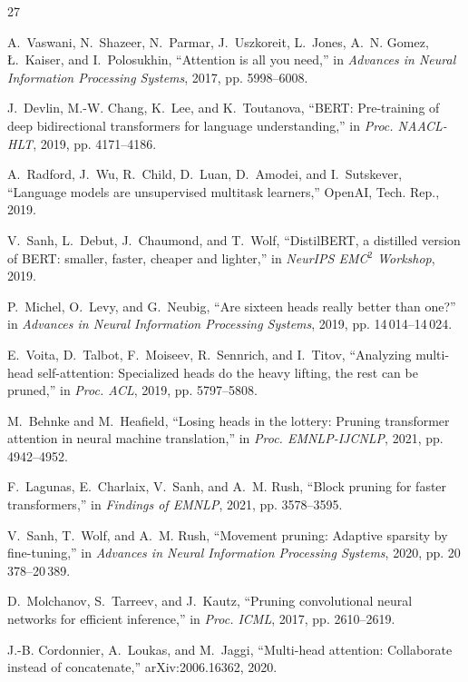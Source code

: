 \documentclass[conference]{IEEEtran}
\begin{document}
\begin{thebibliography}{27}

A.~Vaswani, N.~Shazeer, N.~Parmar, J.~Uszkoreit, L.~Jones, A.~N. Gomez,
{\L}.~Kaiser, and I.~Polosukhin, ``Attention is all you need,'' in
\emph{Advances in Neural Information Processing Systems}, 2017,
pp. 5998--6008.

J.~Devlin, M.-W. Chang, K.~Lee, and K.~Toutanova, ``BERT: Pre-training of
deep bidirectional transformers for language understanding,'' in
\emph{Proc. NAACL-HLT}, 2019, pp. 4171--4186.

A.~Radford, J.~Wu, R.~Child, D.~Luan, D.~Amodei, and I.~Sutskever,
``Language models are unsupervised multitask learners,'' OpenAI,
Tech. Rep., 2019.

V.~Sanh, L.~Debut, J.~Chaumond, and T.~Wolf, ``DistilBERT, a distilled
version of BERT: smaller, faster, cheaper and lighter,'' in
\emph{NeurIPS EMC$^2$ Workshop}, 2019.

P.~Michel, O.~Levy, and G.~Neubig, ``Are sixteen heads really better than
one?'' in \emph{Advances in Neural Information Processing Systems},
2019, pp. 14\,014--14\,024.

E.~Voita, D.~Talbot, F.~Moiseev, R.~Sennrich, and I.~Titov, ``Analyzing
multi-head self-attention: Specialized heads do the heavy lifting, the
rest can be pruned,'' in \emph{Proc. ACL}, 2019, pp. 5797--5808.

M.~Behnke and M.~Heafield, ``Losing heads in the lottery: Pruning
transformer attention in neural machine translation,'' in
\emph{Proc. EMNLP-IJCNLP}, 2021, pp. 4942--4952.

F.~Lagunas, E.~Charlaix, V.~Sanh, and A.~M. Rush, ``Block pruning for
faster transformers,'' in \emph{Findings of EMNLP}, 2021,
pp. 3578--3595.

V.~Sanh, T.~Wolf, and A.~M. Rush, ``Movement pruning: Adaptive sparsity
by fine-tuning,'' in \emph{Advances in Neural Information Processing
Systems}, 2020, pp. 20\,378--20\,389.

D.~Molchanov, S.~Tarreev, and J.~Kautz, ``Pruning convolutional neural
networks for efficient inference,'' in \emph{Proc. ICML}, 2017,
pp. 2610--2619.

J.-B. Cordonnier, A.~Loukas, and M.~Jaggi, ``Multi-head attention:
Collaborate instead of concatenate,'' arXiv:2006.16362, 2020.


\end{thebibliography}
\end{document}
